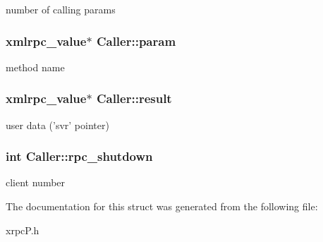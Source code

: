 number of calling params \hypertarget{structCaller_29d5894771b1992590480d27ceb401e5}{
\subsubsection[{param}]{\setlength{\rightskip}{0pt plus 5cm}xmlrpc\_\-value$\ast$ {\bf Caller::param}}}
\label{structCaller_29d5894771b1992590480d27ceb401e5}


method name \hypertarget{structCaller_96d6cfd2ecc822be1f59b80216def471}{
\subsubsection[{result}]{\setlength{\rightskip}{0pt plus 5cm}xmlrpc\_\-value$\ast$ {\bf Caller::result}}}
\label{structCaller_96d6cfd2ecc822be1f59b80216def471}


user data ('svr' pointer) \hypertarget{structCaller_0ca9f4efebeb5d3859a2dfee2a62a79f}{
\subsubsection[{rpc\_\-shutdown}]{\setlength{\rightskip}{0pt plus 5cm}int {\bf Caller::rpc\_\-shutdown}}}
\label{structCaller_0ca9f4efebeb5d3859a2dfee2a62a79f}


client number 

The documentation for this struct was generated from the following file:\begin{CompactItemize}
\item 
xrpcP.h\end{CompactItemize}
